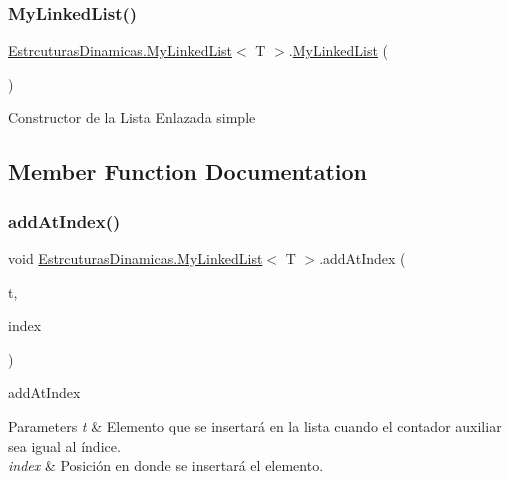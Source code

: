 \subsubsection{\texorpdfstring{My\+Linked\+List()}{MyLinkedList()}}
{\footnotesize\ttfamily \mbox{\hyperlink{class_estrcuturas_dinamicas_1_1_my_linked_list}{Estrcuturas\+Dinamicas.\+My\+Linked\+List}}$<$ T $>$.\mbox{\hyperlink{class_estrcuturas_dinamicas_1_1_my_linked_list}{My\+Linked\+List}} (\begin{DoxyParamCaption}{ }\end{DoxyParamCaption})}



Constructor de la Lista Enlazada simple 



\subsection{Member Function Documentation}
\mbox{\label{class_estrcuturas_dinamicas_1_1_my_linked_list_a4d9d6536ccbba5894b22bb3a4a757097}} 
\subsubsection{\texorpdfstring{add\+At\+Index()}{addAtIndex()}}
{\footnotesize\ttfamily void \mbox{\hyperlink{class_estrcuturas_dinamicas_1_1_my_linked_list}{Estrcuturas\+Dinamicas.\+My\+Linked\+List}}$<$ T $>$.add\+At\+Index (\begin{DoxyParamCaption}\item[{T}]{t,  }\item[{int}]{index }\end{DoxyParamCaption})}



add\+At\+Index 


\begin{DoxyParams}{Parameters}
{\em t} & Elemento que se insertará en la lista cuando el contador auxiliar sea igual al índice.\\
\hline
{\em index} & Posición en donde se insertará el elemento.\\
\hline
\end{DoxyParams}
\mbox{\label{class_estrcuturas_dinamicas_1_1_my_linked_list_aad1dd367db3ec4b27fb2d5700f8b243f}} 
